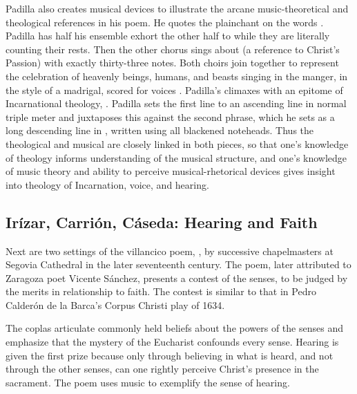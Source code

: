 Padilla also creates musical devices to illustrate the arcane music-theoretical 
and theological references in his poem.
He quotes the plainchant  on the words .
Padilla has half his ensemble exhort the other half to  while they are literally counting their rests.
Then the other chorus sings about  (a 
reference to Christ's Passion) with exactly thirty-three notes.
Both choirs join together to represent the celebration of heavenly beings, 
humans, and beasts singing in the manger, in the style of a madrigal, scored 
for voices .
Padilla's  climaxes with an epitome of Incarnational theology, 
.
Padilla sets the first line to an ascending line in normal triple meter and 
juxtaposes this against the second phrase, which he sets as a long descending 
line in , written using all blackened noteheads.
Thus the theological and musical are closely linked in both pieces, so that 
one's knowledge of theology informs understanding of the musical structure, and 
one's knowledge of music theory and ability to perceive musical-rhetorical 
devices gives insight into theology of Incarnation, voice, and hearing.

\subsection{Irízar, Carrión, Cáseda: Hearing and Faith}

Next are two settings of the villancico poem, , by successive chapelmasters at Segovia Cathedral in the 
later seventeenth century.
The poem, later attributed to Zaragoza poet Vicente Sánchez, presents a contest 
of the senses, to be judged by the merits in relationship to faith.
The contest is similar to that in Pedro Calderón de la Barca's Corpus Christi 
play  of 1634.

The coplas articulate commonly held beliefs about the powers of the senses and 
emphasize that the mystery of the Eucharist confounds every sense.
Hearing is given the first prize because only through believing in what is 
heard, and not through the other senses, can one rightly perceive Christ's 
presence in the sacrament.
The poem uses music to exemplify the sense of hearing.

